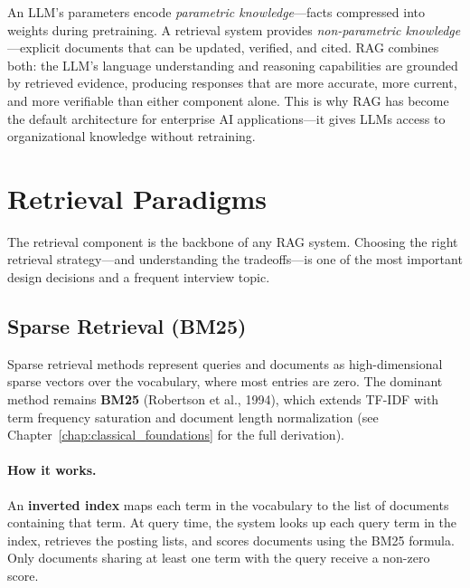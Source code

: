 \begin{keyinsight}
An LLM's parameters encode \emph{parametric knowledge}---facts compressed into
weights during pretraining.  A retrieval system provides \emph{non-parametric
knowledge}---explicit documents that can be updated, verified, and cited.  RAG
combines both: the LLM's language understanding and reasoning capabilities are
grounded by retrieved evidence, producing responses that are more accurate,
more current, and more verifiable than either component alone.  This is why
RAG has become the default architecture for enterprise AI applications---it
gives LLMs access to organizational knowledge without retraining.
\end{keyinsight}


\section{Retrieval Paradigms}
\label{sec:retrieval-paradigms}

The retrieval component is the backbone of any RAG system.  Choosing the right
retrieval strategy---and understanding the tradeoffs---is one of the most
important design decisions and a frequent interview topic.

\subsection{Sparse Retrieval (BM25)}

Sparse retrieval methods represent queries and documents as high-dimensional
sparse vectors over the vocabulary, where most entries are zero.  The dominant
method remains \textbf{BM25} (Robertson et al., 1994), which extends TF-IDF
with term frequency saturation and document length normalization (see
Chapter~\ref{chap:classical_foundations} for the full derivation).

\paragraph{How it works.}
An \textbf{inverted index} maps each term in the vocabulary to the list of
documents containing that term.  At query time, the system looks up each query
term in the index, retrieves the posting lists, and scores documents using the
BM25 formula.  Only documents sharing at least one term with the query receive
a non-zero score.


